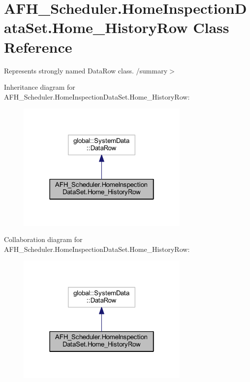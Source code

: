 \section{A\+F\+H\+\_\+\+Scheduler.\+Home\+Inspection\+Data\+Set.\+Home\+\_\+\+History\+Row Class Reference}
\label{class_a_f_h___scheduler_1_1_home_inspection_data_set_1_1_home___history_row}


Represents strongly named Data\+Row class. /summary$>$  




Inheritance diagram for A\+F\+H\+\_\+\+Scheduler.\+Home\+Inspection\+Data\+Set.\+Home\+\_\+\+History\+Row\+:
\nopagebreak
\begin{figure}[H]
\begin{center}
\leavevmode
\includegraphics[width=238pt]{class_a_f_h___scheduler_1_1_home_inspection_data_set_1_1_home___history_row__inherit__graph}
\end{center}
\end{figure}


Collaboration diagram for A\+F\+H\+\_\+\+Scheduler.\+Home\+Inspection\+Data\+Set.\+Home\+\_\+\+History\+Row\+:
\nopagebreak
\begin{figure}[H]
\begin{center}
\leavevmode
\includegraphics[width=238pt]{class_a_f_h___scheduler_1_1_home_inspection_data_set_1_1_home___history_row__coll__graph}
\end{center}
\end{figure}
